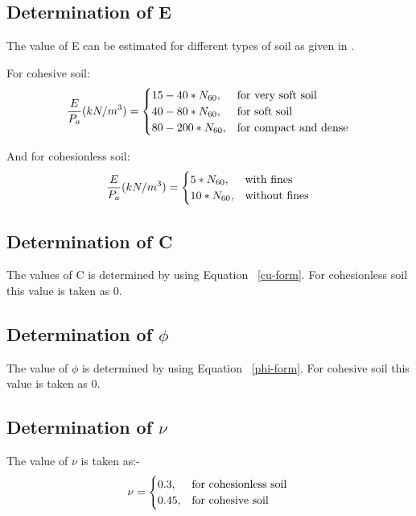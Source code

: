 \subsection{Determination of E}
The value of E can be estimated for different types of soil as given in \cite{kulhawy_manual_1990}.
\par
For cohesive soil:
\begin{equation}
\frac{E}{P_a}(kN/m^3)= \begin{cases}
    15-40 * N_{60}, & \text{for very soft soil}\\
    40-80 * N_{60}, & \text{for soft soil}\\
    80-200 * N_{60}, & \text{for compact and dense}
    \end{cases}\\
\end{equation}
\par
And for cohesionless soil:
\begin{equation}
\frac{E}{P_a}(kN/m^3)= \begin{cases}
    5 * N_{60}, & \text{with fines}\\
    10 * N_{60}, & \text{without fines}
    \end{cases}\\
\end{equation}

\subsection{Determination of C}
The values of C is determined by using Equation ~\ref{cu-form}. For cohesionless soil this value is taken as 0.

\subsection{Determination of $\phi$}
The value of $\phi$ is determined by using Equation ~\ref{phi-form}. For cohesive soil this value is taken as 0.

\subsection{Determination of $\nu$}
The value of $\nu$ is taken as:-
\begin{equation}
\nu= \begin{cases}
    0.3, & \text{for cohesionless soil}\\
    0.45, & \text{for cohesive soil}
    \end{cases}\\
\end{equation}

